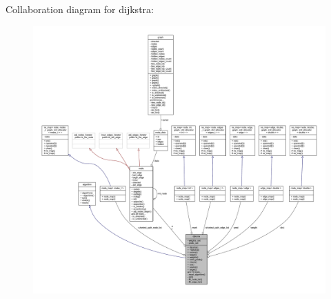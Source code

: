 Collaboration diagram for dijkstra\+:\nopagebreak
\begin{figure}[H]
\begin{center}
\leavevmode
\includegraphics[width=350pt]{classdijkstra__coll__graph}
\end{center}
\end{figure}
